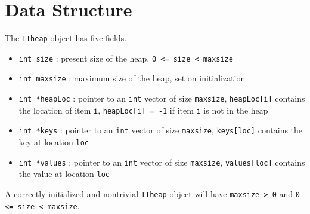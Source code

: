\par
\section{Data Structure}
\label{section:IIheap:dataStructure}
\par
The {\tt IIheap} object has five fields.
\begin{itemize}
\item 
{\tt int size}    : present size of the heap, {\tt 0 <= size < maxsize} 
\item 
{\tt int maxsize} : maximum size of the heap, set on initialization 
\item 
{\tt int *heapLoc} : 
pointer to an {\tt int} vector of size {\tt maxsize}, 
{\tt heapLoc[i]} contains the location of item {\tt i}, 
{\tt heapLoc[i] = -1} if item {\tt i} is not in the heap 
\item 
{\tt int *keys} : 
pointer to an {\tt int} vector of size {\tt maxsize}, 
{\tt keys[loc]} contains the key at location {\tt loc} 
\item 
{\tt int *values} : 
pointer to an {\tt int} vector of size {\tt maxsize}, 
{\tt values[loc]} contains the value at location {\tt loc} 
\end{itemize}
A correctly initialized and nontrivial {\tt IIheap} object 
will have {\tt maxsize > 0} and {\tt 0 <= size < maxsize}.
